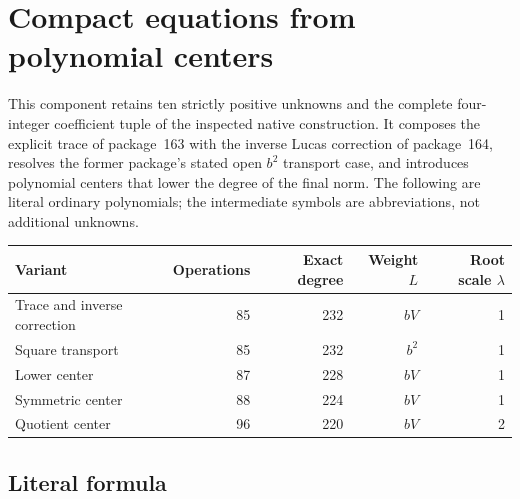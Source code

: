 \section{Compact equations from polynomial centers}

This component retains ten strictly positive unknowns and the complete
four-integer coefficient tuple of the inspected native construction.
It composes the explicit trace of package~163 with the inverse Lucas
correction of package~164, resolves the former package's stated open
$b^2$ transport case, and introduces polynomial centers that lower the
degree of the final norm. The following are literal ordinary polynomials;
the intermediate symbols are abbreviations, not additional unknowns.

\begin{center}
\begin{tabular}{lrrrr}
\toprule
Variant & Operations & Exact degree & Weight $L$ & Root scale $\lambda$\\
\midrule
Trace and inverse correction &85&232&$bV$&1\\
Square transport &85&232&$b^2$&1\\
Lower center &87&228&$bV$&1\\
Symmetric center &88&224&$bV$&1\\
Quotient center &96&220&$bV$&2\\
\bottomrule
\end{tabular}
\end{center}

\subsection{Literal formula}

